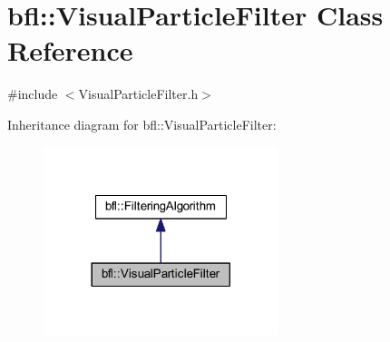 \hypertarget{classbfl_1_1VisualParticleFilter}{}\section{bfl\+:\+:Visual\+Particle\+Filter Class Reference}
\label{classbfl_1_1VisualParticleFilter}


{\ttfamily \#include $<$Visual\+Particle\+Filter.\+h$>$}



Inheritance diagram for bfl\+:\+:Visual\+Particle\+Filter\+:
\nopagebreak
\begin{figure}[H]
\begin{center}
\leavevmode
\includegraphics[width=194pt]{classbfl_1_1VisualParticleFilter__inherit__graph}
\end{center}
\end{figure}
